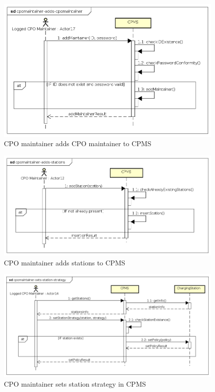 \begin{figure}[!h]
    \begin{center}
        \includegraphics[keepaspectratio, width=16cm]{Sequence/cpomaintainer-adds-cpomaintainer.png}
        \caption{\ac{CPO} maintainer adds \ac{CPO} maintainer to \ac{CPMS}}
    \end{center}
\end{figure}
\begin{figure}[!h]
    \begin{center}
        \includegraphics[keepaspectratio, width=16cm]{Sequence/cpomaintainer-adds-stations.png}
        \caption{\ac{CPO} maintainer adds stations to \ac{CPMS}}
    \end{center}
\end{figure}
\begin{figure}[!h]
    \begin{center}
        \includegraphics[keepaspectratio, width=16cm]{Sequence/cpomaintainer-sets-station-strategy.png}
        \caption{\ac{CPO} maintainer sets station strategy in \ac{CPMS}}
    \end{center}
\end{figure}

